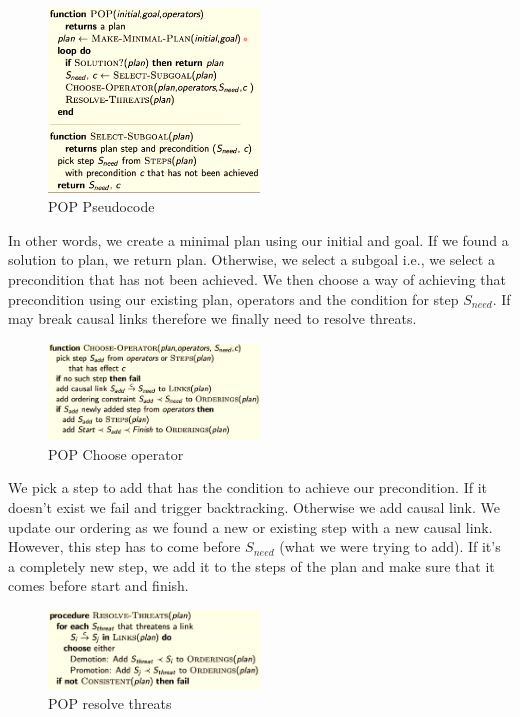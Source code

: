 \documentclass[a4paper]{article}
\theoremstyle{plain}
\theoremstyle{definition}
\theoremstyle{remark}
\begin{document}
\begin{figure}[H]
	\centering
	\includegraphics[width=0.5\textwidth]{pop1.png}
	\caption{POP Pseudocode}
	\label{fig:pop1-png}
\end{figure}
In other words, we create a minimal plan using our initial and goal. If we found a solution to plan, we return plan. Otherwise, we select a subgoal i.e., we select a precondition that has not been achieved. We then choose a way of achieving that precondition using our existing plan, operators and the condition for step $S_{need}$. If may break causal links therefore we finally need to resolve threats. 
\begin{figure}[H]
	\centering
	\includegraphics[width=0.5\textwidth]{pop2.png}
	\caption{POP Choose operator}
	\label{fig:pop2-png}
\end{figure}
We pick a step to add that has the condition to achieve our precondition. If it doesn't exist we fail and trigger backtracking. Otherwise we add causal link. We update our ordering as we found a new or existing step with a new causal link. However, this step has to come before $S_{need}$ (what we were trying to add). If it's a completely new step, we add it to the steps of the plan and make sure that it comes before start and finish.
\begin{figure}[H]
	\centering
	\includegraphics[width=0.5\textwidth]{pop3.png}
	\caption{POP resolve threats}
	\label{fig:pop3-png}
\end{figure}
\end{document}
